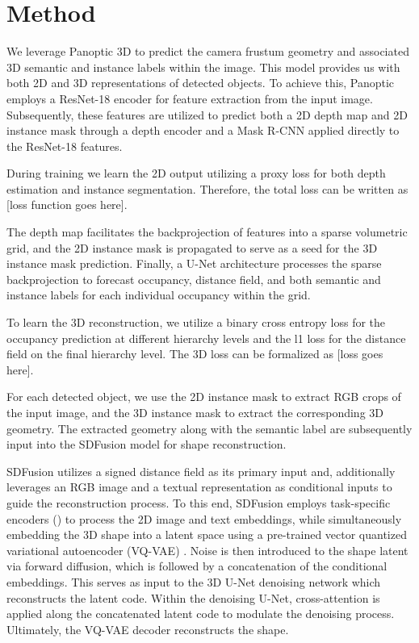 \section{Method}
\label{sec:method}

We leverage Panoptic 3D \cite{dahnert2021panoptic} to predict the camera frustum geometry and associated 3D semantic and instance labels within the image. This model provides us with both 2D and 3D representations of detected objects. To achieve this, Panoptic employs a ResNet-18 encoder for feature extraction from the input image. Subsequently, these features are utilized to predict both a 2D depth map and 2D instance mask through a depth encoder and a Mask R-CNN applied directly to the ResNet-18 features. 

During training we learn the 2D output utilizing a proxy loss for both depth estimation and instance segmentation. Therefore, the total loss can be written as [loss function goes here].

The depth map facilitates the backprojection of features into a sparse volumetric grid, and the 2D instance mask is propagated to serve as a seed for the 3D instance mask prediction. Finally, a U-Net architecture processes the sparse backprojection to forecast occupancy, distance field, and both semantic and instance labels for each individual occupancy within the grid.

To learn the 3D reconstruction, we utilize a binary cross entropy loss for the occupancy prediction at different hierarchy levels and the l1 loss for the distance field on the final hierarchy level. The 3D loss can be formalized as [loss goes here].

For each detected object, we use the 2D instance mask to extract RGB crops of the input image, and the 3D instance mask to extract the corresponding 3D geometry.
The extracted geometry along with the semantic label are subsequently input into the SDFusion model for shape reconstruction.

SDFusion \cite{cheng2023sdfusion} utilizes a signed distance field as its primary input and, additionally leverages an RGB image and a textual representation as conditional inputs to guide the reconstruction process. To this end, SDFusion employs task-specific encoders (\citep{radford2021learning, devlin2018bert}) to process the 2D image and text embeddings, while simultaneously embedding the 3D shape into a latent space using a pre-trained vector quantized variational autoencoder (VQ-VAE) \citep{oord2017neural}. Noise is then introduced to the shape latent via forward diffusion, which is followed by a concatenation of the conditional embeddings. This serves as input to the 3D U-Net \citep{ronneberger2015u} denoising network which reconstructs the latent code. Within the denoising U-Net, cross-attention is applied along the concatenated latent code to modulate the denoising process. Ultimately, the VQ-VAE decoder reconstructs the shape.

